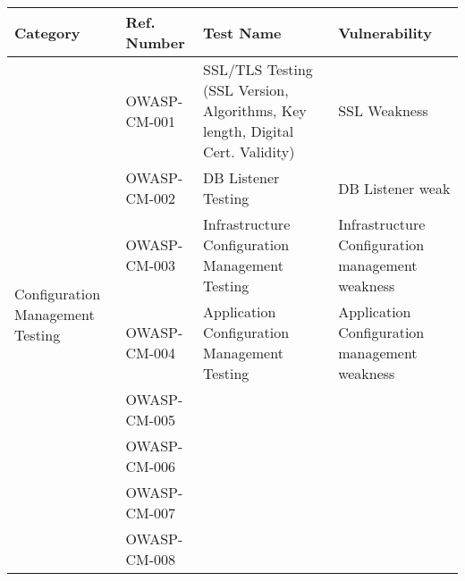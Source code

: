 		\begin{tabularx}{15cm}{| X | X | X | X |}	
			\hline
			\rowcolor[gray]{.9}
			{\bf Category} &  {\bf Ref. Number} & {\bf Test Name} & {\bf Vulnerability} \\ \hline
			\multirow{8}{*}{\begin{minipage}{0.7in} Configuration Management Testing \end{minipage}} & 
			OWASP-CM-001 & SSL/TLS Testing (SSL Version, Algorithms, Key length, Digital Cert. Validity) & 
			SSL Weakness \\ \cline{2-4}
			 & OWASP-CM-002 & DB Listener Testing & DB Listener weak \\ \cline{2-4}
			 & OWASP-CM-003 &  Infrastructure Configuration Management Testing & Infrastructure 
			 Configuration  management weakness \\ \cline{2-4}
		 	 & OWASP-CM-004 & Application Configuration Management Testing  &  Application
		 	 Configuration management weakness \\ \cline{2-4}
			 & OWASP-CM-005 &  &  \\ \cline{2-4}
			 & OWASP-CM-006 &  &  \\ \cline{2-4}
			 & OWASP-CM-007 &  &  \\ \cline{2-4}
			 & OWASP-CM-008 &  &  \\ \hline
		\end{tabularx}